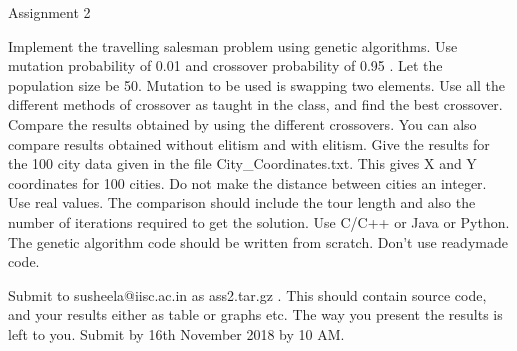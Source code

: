 Assignment 2

Implement the travelling salesman problem using genetic algorithms. Use
mutation probability of 0.01 and crossover probability of 0.95 . Let the
population size be 50. Mutation to be used is swapping two elements. Use all 
the different methods of crossover as taught in the class, and find the best 
crossover. Compare the results obtained by using the different crossovers. You 
can also compare results obtained without elitism and with elitism. Give the 
results for the 100 city data given in the file City_Coordinates.txt. This gives
X and Y coordinates for 100 cities. Do not make the distance
between cities an integer. Use real values. The comparison should include the tour 
length and also the number of iterations required to get the solution. Use C/C++
or Java or Python. The genetic algorithm code should be written from scratch. 
Don't use readymade code.

Submit to susheela@iisc.ac.in as ass2.tar.gz . This should contain source code,
and your results either as table or graphs etc. The way you present the
results is left to you. Submit by 16th November 2018 by 10 AM.
